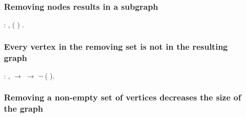 \subsubsection{Removing nodes results in a subgraph}


\begin{coqdoccode}
\coqdocnoindent
{}  : \coqdockw{\ensuremath{\forall}}  ,  (  ) .\coqdoceol
\coqdocemptyline
\end{coqdoccode}
\subsubsection{Every vertex in the removing set is not in the resulting graph}


\begin{coqdoccode}
\coqdocemptyline
\coqdocnoindent
{}  : \coqdockw{\ensuremath{\forall}}   ,    \ensuremath{\rightarrow}    \ensuremath{\rightarrow} \ensuremath{\lnot}   (  ).\coqdoceol
\coqdocemptyline
\end{coqdoccode}
\subsubsection{Removing a non-empty set of vertices decreases the size of the graph}



